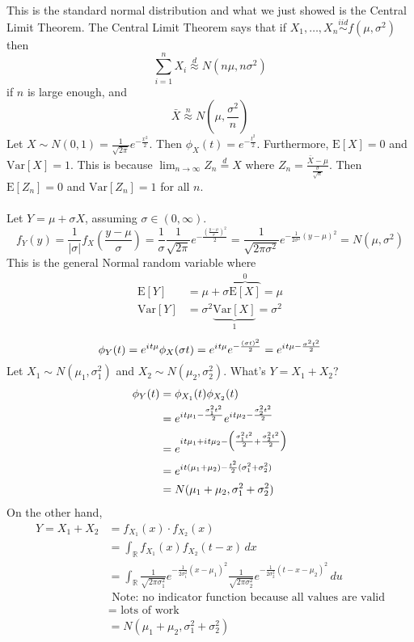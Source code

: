 \documentclass[12pt]{article}
\newcommand{\iid}{\stackrel{iid}{\sim}}
\newcommand{\expected}[1]{\mathrm{E}[#1]}
\newcommand{\variance}[1]{\mathrm{Var}[#1]}
\renewcommand{\i}{{i\mkern1mu}}
\begin{document}
This is the standard normal distribution and what we just showed is the Central Limit Theorem. 
The Central Limit Theorem says that if $X_1, \dots, X_n \iid f(\mu, \sigma^2)$ then $$ \sum_{i = 1}^n X_i \stackrel{d}{\approx} N(n\mu, n\sigma^2)$$ if $n$ is large enough, and $$ \bar{X} \stackrel{n}{\approx} N(\mu, \frac{\sigma^2}{n}) $$ 
Let $X \sim N(0,1) = \frac{1}{\sqrt{2\pi}} e^{-\frac{x^2}{2}}$. Then $\phi_X(t) = e^{-\frac{t^2}{2}}$. Furthermore, $\expected{X} = 0$ and $\variance{X} = 1$. This is because $ \lim_{n \to \infty} Z_n \stackrel{d}{=} X$ where $Z_n = \frac{\bar{X} - \mu}{\frac{\sigma}{\sqrt{n}}}$. Then $\expected{Z_n} = 0$ and $\variance{Z_n} = 1$ for all $n$. \\~\\
Let $Y = \mu + \sigma X$, assuming $\sigma \in (0, \infty)$. 
$$f_Y(y) = \frac{1}{|\sigma|} f_X(\frac{y - \mu}{\sigma}) = \frac{1}{\sigma} \frac{1}{\sqrt{2\pi}} e^{-\frac{ (\frac{y - \mu}{\sigma})^2}{2}} = \frac{1}{\sqrt{2\pi \sigma^2}} e^{-\frac{1}{2\sigma^2}(y - \mu)^2} = N(\mu, \sigma^2) $$ This is the general Normal random variable where $$ \begin{aligned} \expected{Y} &= \mu + \sigma \overbrace{\expected{X}}^0 = \mu \\ \variance{Y} &= \sigma^2 \underbrace{\variance{X}}_1 = \sigma^2 \end{aligned} $$ 
$$\phi_Y(t) = e^{\i t \mu} \phi_X(\sigma t) = e^{\i t\mu} e^{- \frac{(\sigma t)^2}{2}} = e^{\i t \mu - \frac{\sigma^2 t^2}{2}} $$ 
Let $X_1 \sim N(\mu_1, \sigma_1^2)$ and $X_2 \sim N(\mu_2, \sigma_2^2)$. What's $Y = X_1 + X_2$? 
$$ \begin{aligned} \phi_Y(t) &= \phi_{X_1}(t) \phi_{X_2}(t) \\ &= e^{\i t\mu_1 - \frac{\sigma_1^2 t^2}{2}} e^{\i t\mu_2 - \frac{\sigma_2^2 t^2}{2}} \\ &= e^{\i t\mu_1 + \i t \mu_2 - \Big( \frac{\sigma_1^2 t^2}{2} + \frac{\sigma_2^2 t^2}{2}\Big)} \\ &= e^{\i t (\mu_1 + \mu_2) - \frac{t^2}{2}(\sigma_1^2 + \sigma_2^2)} \\ &= N(\mu_1 + \mu_2, \sigma_1^2 + \sigma_2^2) \end{aligned} $$ On the other hand, $$ \begin{aligned} Y = X_1 + X_2 &= f_{X_1}(x) \cdot f_{X_2}(x) \\ &= \int_{\mathbb{R}} f_{X_1}(x)f_{X_2}(t-x) \, dx \\ &= \int_{\mathbb{R}} \frac{1}{\sqrt{2\pi \sigma_1^2}} e^{-\frac{1}{2\sigma_1^2}(x - \mu_1)^2} \frac{1}{\sqrt{2\pi \sigma_2^2}} e^{-\frac{1}{2\sigma_2^2}(t - x - \mu_2)^2} \, du \\ &\text{ Note: no indicator function because all values are valid} \\ &= \text{ lots of work} \\ &= N(\mu_1 + \mu_2, \sigma_1^2 + \sigma_2^2) \end{aligned} $$ 
\end{document}
